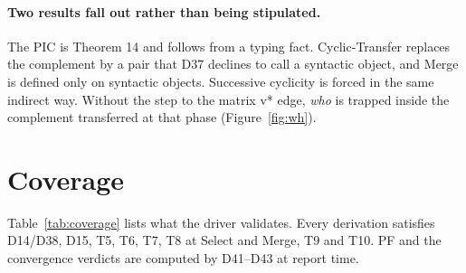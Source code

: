 \documentclass[11pt,a4paper]{article}
\newcommand{\pf}[1]{\textit{#1}}
\begin{document}
\paragraph{Two results fall out rather than being stipulated.} The PIC is
Theorem 14 and follows from a typing fact. Cyclic-Transfer replaces the
complement by a pair that D37 declines to call a syntactic object, and Merge
is defined only on syntactic objects. Successive cyclicity is forced in the
same indirect way. Without the step to the matrix v* edge, \pf{who} is
trapped inside the complement transferred at that phase
(Figure~\ref{fig:wh}).

\section{Coverage}

Table~\ref{tab:coverage} lists what the driver validates. Every derivation
satisfies D14/D38, D15, T5, T6, T7, T8 at Select and Merge, T9 and T10. PF
and the convergence verdicts are computed by D41--D43 at report time.
\end{document}
